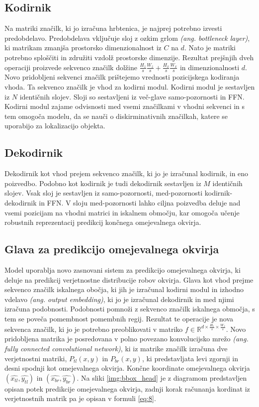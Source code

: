 \documentclass[a4paper,12pt,openright]{book}
\begin{document}
\subsection{Kodirnik}
Na matriki značilk, ki jo izračuna hrbtenica, je najprej potrebno izvesti predobdelavo. Predobdelava vključuje sloj z ozkim grlom \emph{(ang. bottleneck layer)}, ki matrikam zmanjša prostorsko dimenzionalnost iz $ C $ na $ d $. Nato je matriki potrebno sploščiti in združiti vzdolž prostorske dimenzije. Rezultat prejšnjih dveh operaciji proizvede sekvenco značilk dolžine $ \frac{H_z}{s}\frac{W_z}{s} + \frac{H_x}{s}\frac{W_x}{s} $ in dimenzionalnosti $ d $. Novo pridobljeni sekvenci značilk prištejemo vrednosti pozicijskega kodiranja vhoda. Ta sekvenco značilk je vhod za kodirni modul. Kodirni modul je sestavljen iz $ N $ identičnih slojev. Sloji so sestavljeni iz več-glave samo-pozornosti in FFN. Kodirni modul zajame odvisnosti med vsemi značilkami v vhodni sekvenci in s tem omogoča modelu, da se nauči o diskirminativnih značilkah, katere se uporabijo za lokalizacijo objekta.

\subsection{Dekodirnik}
Dekodirnik kot vhod prejem sekvenco značilk, ki jo je izračunal kodirnik, in eno poizvedbo. Podobno kot kodirnik je tudi dekodirnik sestavljen iz $ M $ identičnih slojev. Vsak sloj je sestavljen iz samo-pozornosti, med-pozornosti kodirnik-dekodirnik in FFN. V sloju med-pozornosti lahko ciljna poizvedba deluje nad vsemi pozicijam na vhodni matrici in iskalnem območju, kar omogoča učenje robustnih reprezentacij predikcij končnega omejevalnega okvirja.

\subsection{Glava za predikcijo omejevalnega okvirja}
Model uporablja novo zasnovani sistem za predikcijo omejevalnega okvirja, ki deluje na predikcij verjetnostne distribucije robov okvirja. Glava kot vhod prejme sekvenco značilk iskalnega obočja, ki jih je izračunal kodirni modul in izhodno vdelavo \emph{(ang. output embedding)}, ki jo je izračunal dekodirnik in med njimi izračuna podobnosti. Podobnosti pomnoži z sekvenco značilk iskalnega območja, s tem se poveča pomembnost pomembnih regij. Rezultat te operacije je nova sekvenca značilk, ki jo je potrebno preoblikovati v matriko $ f \in \mathbb{R}^{d \times \frac{H_s}{s} \times \frac{W_s}{s}} $. Novo pridobljena matrika je posredovana v polno povezano konvolucijsko mrežo \emph{(ang. fully connected convolutional network)}, ki iz matrike značilk izračuna dve verjetnostni matriki, $ P_{tl}(x,y) $ in  $ P_{br}(x,y) $, ki predstavljata levi zgornji in desni spodnji kot omejevalnega okvirja. Končne koordinate omejevalnega okvirja $ (\hat{x_{tl}}, \hat{y_{tl}}) $ in $ (\hat{x_{br}}, \hat{y_{br}}) $. Na sliki \ref{img:bbox_head} je z diagramom predstavljen opisan potek predikcije omejevalnega okvirja, zadnji korak računanja kordinat iz verjetnostnih matrik pa je opisan v formuli \ref{eq:8}.
\end{document}
